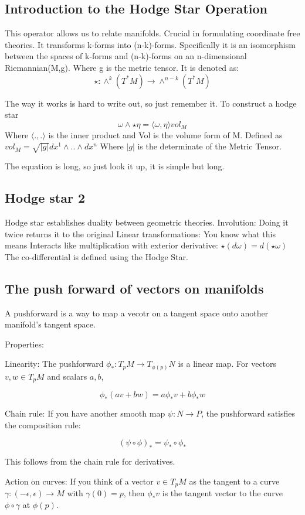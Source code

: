 \subsection{Introduction to the Hodge Star Operation}
This operator allows us to relate manifolds. Crucial in formulating coordinate free theories. It transforms k-forms into (n-k)-forms.
Specifically it is an isomorphism between the spaces of k-forms and (n-k)-forms on an n-dimensional Riemannian(M,g). Where g is the metric tensor.
It is denoted as:
$$\star: \wedge^k(T^*M)\to \wedge^{n-k}(T^*M)$$

The way it works is hard to write out, so just remember it.
To construct a hodge star
$$\omega \wedge \star \eta = \langle \omega, \eta \rangle vol_M$$
Where $\langle .,. \rangle$ is the inner product
and Vol is the volume form of M. Defined as $vol_M=\sqrt{|g|} dx^1 \wedge .. \wedge dx^n$ Where $|g|$ is the determinate of the Metric Tensor.

The equation is long, so just look it up, it is simple but long.

\subsection{Hodge star 2}
Hodge star establishes duality between geometric theories.
Involution: Doing it twice returns it to the original 
Linear transformations: You know what this means
Interacts like multiplication with exterior derivative: $\star(d \omega) = d(\star \omega)$
The co-differential is defined using the Hodge Star.
\subsection{The push forward of vectors on manifolds}
A pushforward is a way to map a vecotr on a tangent space onto another manifold's tangent space.

Properties:

Linearity: The pushforward $ \phi_*: T_p M \to T_{\phi(p)} N $ is a linear map. For vectors $ v, w \in T_p M $ and scalars $ a, b $,

$$\phi_*(a v + b w) = a \phi_* v + b \phi_* w$$

Chain rule: If you have another smooth map $ \psi: N \to P $, the pushforward satisfies the composition rule:

$$(\psi \circ \phi)_* = \psi_* \circ \phi_*$$

This follows from the chain rule for derivatives.

Action on curves: If you think of a vector $ v \in T_p M $ as the tangent to a curve $ \gamma: (-\epsilon, \epsilon) \to M $ with $ \gamma(0) = p $, then $ \phi_* v $ is the tangent vector to the curve $ \phi \circ \gamma $ at $ \phi(p) $.

